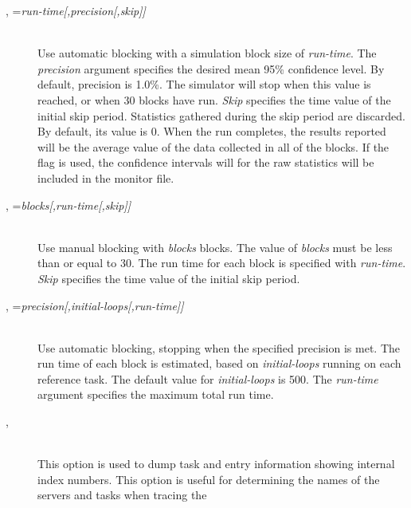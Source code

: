 \begin{description}
\item[, =\emph{run-time[,precision[,skip]]}]~\\
  Use automatic
  blocking with a
  simulation block
  size
  of \emph{run-time}.  The
  \emph{precision} argument specifies the
  desired mean 95\% confidence level.  By
  default, precision is 1.0\%.  The simulator will stop when this
  value is reached, or when 30 blocks have run.
  \emph{Skip} specifies the time value of the
  initial skip period.
  Statistics gathered
  during the skip period are discarded.  By default, its value is 0.
  When the run completes, the results reported will be the average
  value of the data collected in all of the blocks.  If the 
  flag is used, the confidence intervals
  will for the raw statistics will be included in the monitor
  file.
\item[, =\emph{blocks[,run-time[,skip]]}]~\\
  Use manual blocking with
  \emph{blocks} blocks.  The value of \emph{blocks} must be less than
  or equal to 30.  The run time for each block is specified with
  \emph{run-time}.  \emph{Skip}
  specifies the time value of the initial skip period.
\item[, =\emph{precision[,initial-loops[,run-time]]}]~\\
  Use automatic
  blocking, stopping
  when the specified precision is met.
  The run time of each block is estimated, based on
  \emph{initial-loops} running on each
  reference task.  The
  default value for \emph{initial-loops} is 500.  The \emph{run-time}
  argument specifies the maximum total run time.
\item[, ]~\\ This option is used to dump task and entry
  information showing internal index numbers.  This option is useful
  for determining the names of the servers and tasks when tracing the

\end{description}
